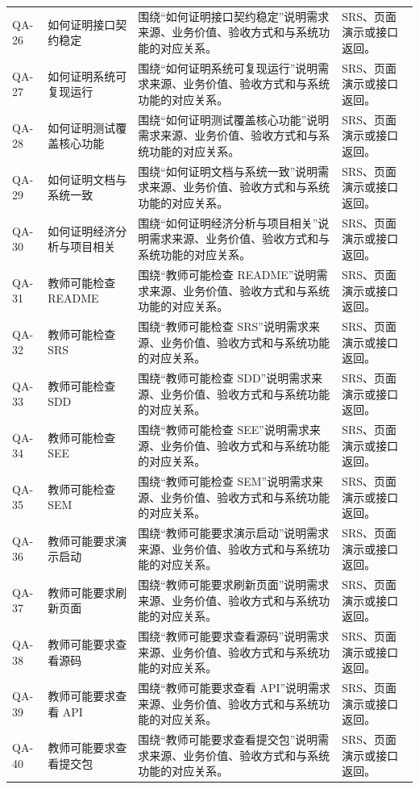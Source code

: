 \documentclass[12pt,a4paper]{ctexart}
\begin{document}
\begin{longtable}{L{1.7cm}L{4.4cm}L{6.0cm}L{3.4cm}}
QA-26 & 如何证明接口契约稳定 & 围绕“如何证明接口契约稳定”说明需求来源、业务价值、验收方式和与系统功能的对应关系。 & SRS、页面演示或接口返回。 \\
QA-27 & 如何证明系统可复现运行 & 围绕“如何证明系统可复现运行”说明需求来源、业务价值、验收方式和与系统功能的对应关系。 & SRS、页面演示或接口返回。 \\
QA-28 & 如何证明测试覆盖核心功能 & 围绕“如何证明测试覆盖核心功能”说明需求来源、业务价值、验收方式和与系统功能的对应关系。 & SRS、页面演示或接口返回。 \\
QA-29 & 如何证明文档与系统一致 & 围绕“如何证明文档与系统一致”说明需求来源、业务价值、验收方式和与系统功能的对应关系。 & SRS、页面演示或接口返回。 \\
QA-30 & 如何证明经济分析与项目相关 & 围绕“如何证明经济分析与项目相关”说明需求来源、业务价值、验收方式和与系统功能的对应关系。 & SRS、页面演示或接口返回。 \\
QA-31 & 教师可能检查 README & 围绕“教师可能检查 README”说明需求来源、业务价值、验收方式和与系统功能的对应关系。 & SRS、页面演示或接口返回。 \\
QA-32 & 教师可能检查 SRS & 围绕“教师可能检查 SRS”说明需求来源、业务价值、验收方式和与系统功能的对应关系。 & SRS、页面演示或接口返回。 \\
QA-33 & 教师可能检查 SDD & 围绕“教师可能检查 SDD”说明需求来源、业务价值、验收方式和与系统功能的对应关系。 & SRS、页面演示或接口返回。 \\
QA-34 & 教师可能检查 SEE & 围绕“教师可能检查 SEE”说明需求来源、业务价值、验收方式和与系统功能的对应关系。 & SRS、页面演示或接口返回。 \\
QA-35 & 教师可能检查 SEM & 围绕“教师可能检查 SEM”说明需求来源、业务价值、验收方式和与系统功能的对应关系。 & SRS、页面演示或接口返回。 \\
QA-36 & 教师可能要求演示启动 & 围绕“教师可能要求演示启动”说明需求来源、业务价值、验收方式和与系统功能的对应关系。 & SRS、页面演示或接口返回。 \\
QA-37 & 教师可能要求刷新页面 & 围绕“教师可能要求刷新页面”说明需求来源、业务价值、验收方式和与系统功能的对应关系。 & SRS、页面演示或接口返回。 \\
QA-38 & 教师可能要求查看源码 & 围绕“教师可能要求查看源码”说明需求来源、业务价值、验收方式和与系统功能的对应关系。 & SRS、页面演示或接口返回。 \\
QA-39 & 教师可能要求查看 API & 围绕“教师可能要求查看 API”说明需求来源、业务价值、验收方式和与系统功能的对应关系。 & SRS、页面演示或接口返回。 \\
QA-40 & 教师可能要求查看提交包 & 围绕“教师可能要求查看提交包”说明需求来源、业务价值、验收方式和与系统功能的对应关系。 & SRS、页面演示或接口返回。 \\

\end{longtable}
\end{document}

